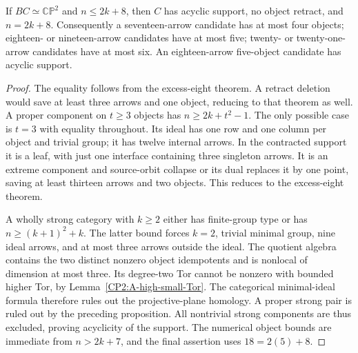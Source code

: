 \begin{corollary}
\label{CP2:A-high-nine-support}
If $BC\simeq\mathbb{CP}^2$ and $n\leq2k+8$, then
$C$ has acyclic support, no object retract, and
$n=2k+8$.  Consequently a seventeen-arrow candidate
has at most four objects; eighteen- or nineteen-arrow
candidates have at most five; twenty- or twenty-one-arrow
candidates have at most six.  An eighteen-arrow
five-object candidate has acyclic support.
\end{corollary}
\begin{proof}
The equality follows from the excess-eight theorem.
A retract deletion would save at least three arrows
and one object, reducing to that theorem as well.
A proper component on $t\geq3$ objects has
$n\geq2k+t^2-1$.  The only possible case is $t=3$
with equality throughout.  Its ideal has one row
and one column per object and trivial group; it has
twelve internal arrows.  In the contracted support
it is a leaf, with just one interface containing
three singleton arrows.  It is an extreme component
and source-orbit collapse or its dual replaces it
by one point, saving at least thirteen arrows and
two objects.  This reduces to the excess-eight
theorem.

A wholly strong category with $k\geq2$ either has
finite-group type or has $n\geq(k+1)^2+k$.
The latter bound forces $k=2$, trivial minimal
group, nine ideal arrows, and at most three arrows
outside the ideal.  The quotient algebra contains
the two distinct nonzero object idempotents and
is nonlocal of dimension at most three.
Its degree-two Tor cannot be nonzero with bounded
higher Tor, by Lemma~\ref{CP2:A-high-small-Tor}.
The categorical minimal-ideal formula therefore
rules out the projective-plane homology.
A proper strong pair is ruled out by the preceding
proposition.  All nontrivial strong components are
thus excluded, proving acyclicity of the support.
The numerical object bounds are immediate from
$n>2k+7$, and the final assertion uses $18=2(5)+8$.
\end{proof}
